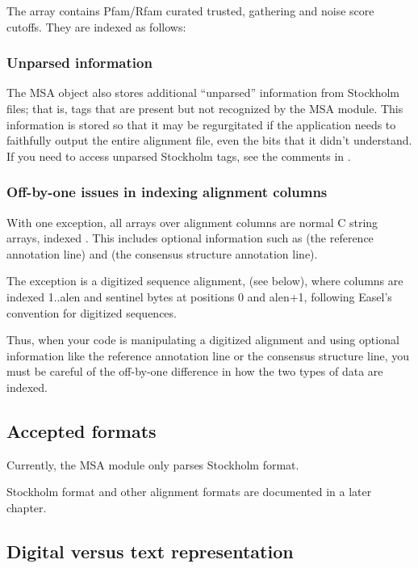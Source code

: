 The  array contains Pfam/Rfam curated trusted, gathering
and noise score cutoffs. They are indexed as follows:





\subsubsection{Unparsed information}

The MSA object also stores additional ``unparsed'' information from
Stockholm files; that is, tags that are present but not recognized by
the MSA module. This information is stored so that it may be
regurgitated if the application needs to faithfully output the entire
alignment file, even the bits that it didn't understand. If you need
to access unparsed Stockholm tags, see the comments in
.



\subsubsection{Off-by-one issues in indexing alignment columns}

With one exception, all arrays over alignment columns are normal C
string arrays, indexed . This includes optional
information such as  (the reference annotation line)
and  (the consensus structure annotation line).

The exception is a digitized sequence alignment, 
(see below), where columns are indexed 1..alen and sentinel bytes at
positions 0 and alen+1, following Easel's convention for digitized
sequences.

Thus, when your code is manipulating a digitized alignment and using
optional information like the reference annotation line or the
consensus structure line, you must be careful of the off-by-one
difference in how the two types of data are indexed.

\subsection{Accepted formats}

Currently, the MSA module only parses Stockholm format. 

Stockholm format and other alignment formats are documented in a later
chapter.

\subsection{Digital versus text representation}

